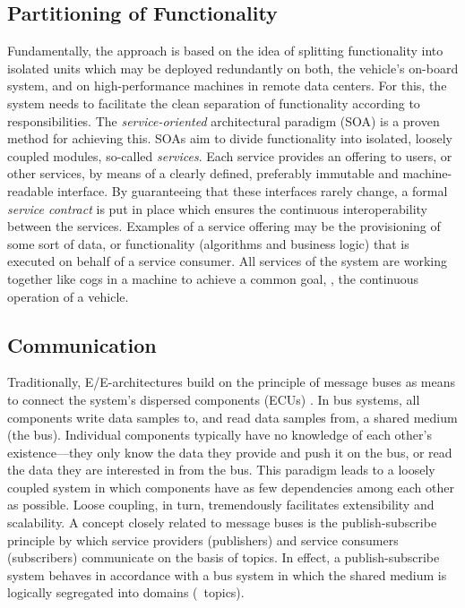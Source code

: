 \subsection{Partitioning of Functionality}
Fundamentally, the approach is based on the idea of splitting functionality into isolated units which may be deployed redundantly on both, the vehicle's on-board system, and on high-performance machines in remote data centers. For this, the system needs to facilitate the clean separation of functionality according to responsibilities. The \emph{service-oriented} architectural paradigm (SOA) \cite{erl2008soa} is a proven method for achieving this. SOAs aim to divide functionality into isolated, loosely coupled modules, so-called \emph{services}. Each service provides an offering to users, or other services, by means of a clearly defined, preferably immutable and machine-readable interface. By guaranteeing that these interfaces rarely change, a formal \emph{service contract} is put in place which ensures the continuous interoperability between the services. Examples of a service offering may be the provisioning of some sort of data, or functionality (algorithms and business logic) that is executed on behalf of a service consumer. All services of the system are working together like cogs in a machine to achieve a common goal, \ie , the continuous operation of a vehicle.


\subsection{Communication}
Traditionally, E/E-architectures build on the principle of message buses as means to connect the system's dispersed components (ECUs) \cite{navet2005trends}. In bus systems, all components write data samples to, and read data samples from, a shared medium (the bus). Individual components typically have no knowledge of each other's existence---they only know the data they provide and push it on the bus, or read the data they are interested in from the bus. This paradigm leads to a loosely coupled system in which components have as few dependencies among each other as possible. Loose coupling, in turn, tremendously facilitates extensibility and scalability. A concept closely related to message buses is the publish-subscribe principle by which service providers (publishers) and service consumers (subscribers) communicate on the basis of topics. In effect, a publish-subscribe system behaves in accordance with a bus system in which the shared medium is logically segregated into domains (\ie\ topics).

